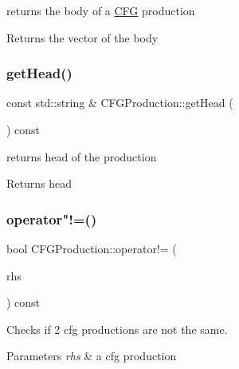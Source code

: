 returns the body of a \hyperlink{classCFG}{C\+FG} production 

\begin{DoxyReturn}{Returns}
the vector of the body 
\end{DoxyReturn}
\mbox{\label{classCFGProduction_a02f373aea381df35d3e889c65a3a5d1a}} 
\subsubsection{\texorpdfstring{get\+Head()}{getHead()}}
{\footnotesize\ttfamily const std\+::string \& C\+F\+G\+Production\+::get\+Head (\begin{DoxyParamCaption}{ }\end{DoxyParamCaption}) const}



returns head of the production 

\begin{DoxyReturn}{Returns}
head 
\end{DoxyReturn}
\mbox{\label{classCFGProduction_ae77d1957395260e4ae310b2d0d738a36}} 
\subsubsection{\texorpdfstring{operator"!=()}{operator!=()}}
{\footnotesize\ttfamily bool C\+F\+G\+Production\+::operator!= (\begin{DoxyParamCaption}\item[{const \hyperlink{classCFGProduction}{C\+F\+G\+Production} \&}]{rhs }\end{DoxyParamCaption}) const}



Checks if 2 cfg productions are not the same. 


\begin{DoxyParams}{Parameters}
{\em rhs} & a cfg production \\
\hline
\end{DoxyParams}
\mbox{\label{classCFGProduction_a5d8151c008e1231e5ed6fae6deacab0d}} 
